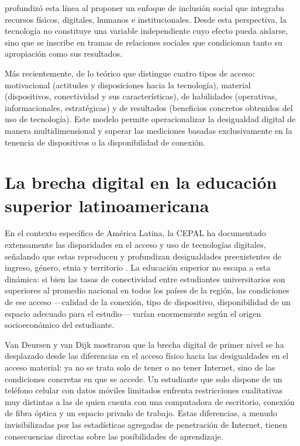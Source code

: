 \textcite{2562-WARSCHAUER2004} profundizó esta línea al proponer un enfoque de inclusión social que integraba recursos físicos, digitales, humanos e institucionales. Desde esta perspectiva, la tecnología no constituye una variable independiente cuyo efecto pueda aislarse, sino que se inscribe en tramas de relaciones sociales que condicionan tanto su apropiación como sus resultados.

Más recientemente, \textcite{2563-VANDIJK2020} de lo teórico que distingue cuatro tipos de acceso: motivacional (actitudes y disposiciones hacia la tecnología), material (dispositivos, conectividad y sus características), de habilidades (operativas, informacionales, estratégicas) y de resultados (beneficios concretos obtenidos del uso de tecnología). Este modelo permite operacionalizar la desigualdad digital de manera multidimensional y superar las mediciones basadas exclusivamente en la tenencia de dispositivos o la disponibilidad de conexión.


\section{La brecha digital en la educación superior latinoamericana}
En el contexto específico de América Latina, la CEPAL ha documentado extensamente las disparidades en el acceso y uso de tecnologías digitales, señalando que estas reproducen y profundizan desigualdades preexistentes de ingreso, género, etnia y territorio \autocite{2566-CEPAL2021}. La educación superior no escapa a esta dinámica: si bien las tasas de conectividad entre estudiantes universitarios son superiores al promedio nacional en todos los países de la región, las condiciones de ese acceso —calidad de la conexión, tipo de dispositivo, disponibilidad de un espacio adecuado para el estudio— varían enormemente según el origen socioeconómico del estudiante.

Van Deursen y van Dijk \autocite{2666-VANDEURSEN2019} mostraron que la brecha digital de primer nivel se ha desplazado desde las diferencias en el acceso físico hacia las desigualdades en el acceso material: ya no se trata solo de tener o no tener Internet, sino de las condiciones concretas en que se accede. Un estudiante que solo dispone de un teléfono celular con datos móviles limitados enfrenta restricciones cualitativas muy distintas a las de quien cuenta con una computadora de escritorio, conexión de fibra óptica y un espacio privado de trabajo. Estas diferencias, a menudo invisibilizadas por las estadísticas agregadas de penetración de Internet, tienen consecuencias directas sobre las posibilidades de aprendizaje.



